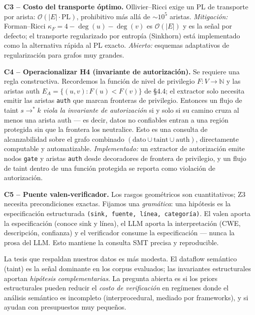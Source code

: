 \documentclass[11pt]{article}
\begin{document}
\textbf{C3 -- Costo del transporte óptimo.} Ollivier--Ricci exige un PL de
transporte por arista: $\mathcal{O}(|E|\cdot\text{PL})$, prohibitivo más allá de
$\sim 10^5$ aristas. \emph{Mitigación:} Forman--Ricci
$\kappa_F = 4 - \deg(u) - \deg(v)$ es $\mathcal{O}(|E|)$ y es la señal por
defecto; el transporte regularizado por entropía (Sinkhorn) está implementado
como la alternativa rápida al PL exacto. \emph{Abierto:} esquemas adaptativos de
regularización para grafos muy grandes.

\textbf{C4 -- Operacionalizar H4 (invariante de autorización).} Se requiere una
regla constructiva. Recordemos la función de nivel de privilegio
$F : V \to \mathbb{N}$ y las aristas auth
$E_A = \{(u,v) : F(u) < F(v)\}$ de \S4.4; el extractor solo necesita emitir las
aristas \texttt{auth} que marcan fronteras de privilegio. Entonces un flujo de taint
$s \to^{*} k$ \emph{viola la invariante de autorización} si y solo si su camino
cruza al menos una arista auth --- es decir, datos no confiables entran a una
región protegida sin que la frontera los neutralice. Esto es una consulta de
alcanzabilidad sobre el grafo combinado
$(\text{dato} \cup \text{taint} \cup \text{auth})$,
directamente computable y automatizable. \emph{Implementado:} un extractor de
autorización emite nodos \texttt{gate} y aristas \texttt{auth} desde decoradores
de frontera de privilegio, y un flujo de taint dentro de una función protegida se
reporta como violación de autorización.

\textbf{C5 -- Puente valen-verificador.} Los rasgos geométricos son
cuantitativos; Z3 necesita precondiciones exactas. Fijamos una \emph{gramática}:
una hipótesis es la especificación estructurada
\texttt{(sink, fuente, línea, categoría)}. El valen aporta la especificación
(conoce sink y línea), el LLM aporta la interpretación (CWE, descripción,
confianza) y el verificador consume la especificación --- nunca la prosa del
LLM. Esto mantiene la consulta SMT precisa y reproducible.

La tesis que respaldan nuestros datos es más modesta. El dataflow semántico
(taint) es la señal dominante en los corpus evaluados; las invariantes
estructurales aportan \emph{hipótesis complementarias}. La pregunta abierta es si
los priors estructurales pueden reducir el \emph{costo de verificación} en
regímenes donde el análisis semántico es incompleto (interprocedural, mediado por
frameworks), y si ayudan con presupuestos muy pequeños.
\end{document}
